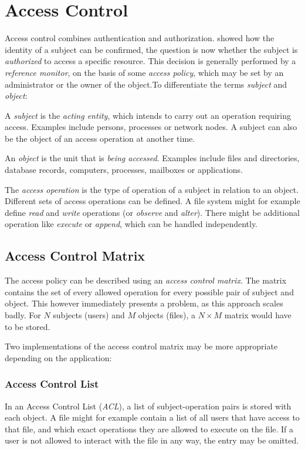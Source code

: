 \chapter{Access Control}
\label{chapter:access_control}
Access control combines authentication and authorization.
 showed how the identity of a subject can be
confirmed, the question is now whether the subject is \emph{authorized} to
access a specific resource. This decision is generally performed by a
\emph{reference monitor}, on the basis of some \emph{access policy}, which may
be set by an administrator or the owner of the object.To differentiate the terms
\textit{subject} and \textit{object}:

A \emph{subject} is the \textit{acting entity}, which intends to carry out an
operation requiring access. Examples include persons, processes or network
nodes. A subject can also be the object of an access operation at another time.

An \emph{object} is the unit that is \textit{being accessed}. Examples include
files and directories, database records, computers, processes, mailboxes or
applications.

The \emph{access operation} is the type of operation of a subject in relation to
an object. Different sets of access operations can be defined. A file system
might for example define \textit{read} and \textit{write} operations (or
\textit{observe} and \textit{alter}). There might be additional operation like
\textit{execute} or \textit{append}, which can be handled independently.

\section{Access Control Matrix}
The access policy can be described using an \textit{access control matrix}. The
matrix contains the set of every allowed operation for every possible pair of
subject and object. This however immediately presents a problem, as this
approach scales badly. For $N$ subjects (users) and $M$ objects (files), a $N
\times M$ matrix would have to be stored.

Two implementations of the access control matrix may be more appropriate
depending on the application:

\subsection{Access Control List}
In an Access Control List (\textit{ACL}), a list of subject-operation pairs is
stored with each object. A file might for example contain a list of all users
that have access to that file, and which exact operations they are allowed to
execute on the file. If a user is not allowed to interact with the file in any
way, the entry may be omitted.


